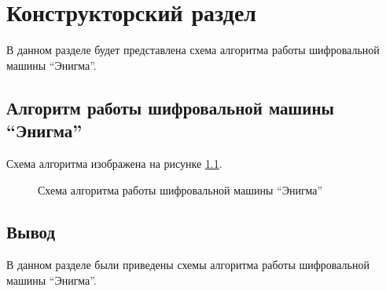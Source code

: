 \chapter{Конструкторский раздел}
\label{cha:design}

В данном разделе будет представлена схема алгоритма работы шифровальной машины ``Энигма''.

\section{Алгоритм работы шифровальной машины ``Энигма''}

Схема алгоритма изображена на рисунке \ref{fig:full_search}.

\begin{figure}[ph!]
	\caption{Схема алгоритма работы шифровальной машины ``Энигма''}
	\label{fig:full_search}
\end{figure}


\section*{Вывод}
В данном разделе были приведены схемы алгоритма работы шифровальной машины ``Энигма''.


